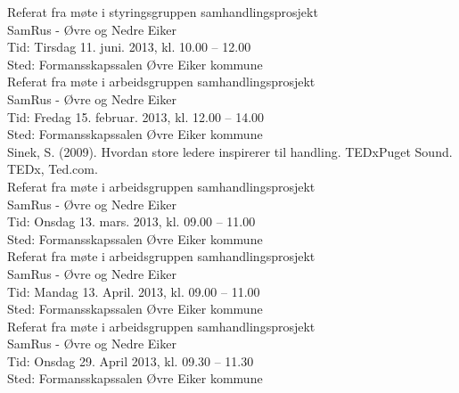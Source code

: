 \documentclass[11pt]{report} %
\begin{document}
\begin{thebibliography}{99}
                  Referat fra møte i styringsgruppen samhandlingsprosjekt\\ 
                  SamRus - Øvre og Nedre Eiker\\
                  Tid: Tirsdag 11. juni. 2013,  kl. 10.00 – 12.00\\
                  Sted: Formansskapssalen Øvre Eiker kommune\\

                  Referat fra møte i arbeidsgruppen samhandlingsprosjekt\\ 
                  SamRus - Øvre og Nedre Eiker\\
                  Tid: Fredag 15. februar. 2013,  kl. 12.00 – 14.00\\
                  Sted: Formansskapssalen Øvre Eiker kommune\\

                  Sinek, S. (2009). Hvordan store ledere inspirerer til handling. TEDxPuget Sound. TEDx, Ted.com.\\

                  Referat fra møte i arbeidsgruppen samhandlingsprosjekt\\ 
                  SamRus - Øvre og Nedre Eiker\\
                  Tid: Onsdag 13. mars. 2013,  kl. 09.00 – 11.00\\
                  Sted: Formansskapssalen Øvre Eiker kommune\\

                  Referat fra møte i arbeidsgruppen samhandlingsprosjekt\\ 
                  SamRus - Øvre og Nedre Eiker\\
                  Tid: Mandag 13. April. 2013,  kl. 09.00 – 11.00\\
                  Sted: Formansskapssalen Øvre Eiker kommune\\

                  Referat fra møte i arbeidsgruppen samhandlingsprosjekt\\ 
                  SamRus - Øvre og Nedre Eiker\\
                  Tid: Onsdag 29. April 2013,  kl. 09.30 – 11.30\\
                  Sted: Formansskapssalen Øvre Eiker kommune\\
  




              \end{thebibliography}

              \listoffigures
              \listoftables

              
\end{document}
